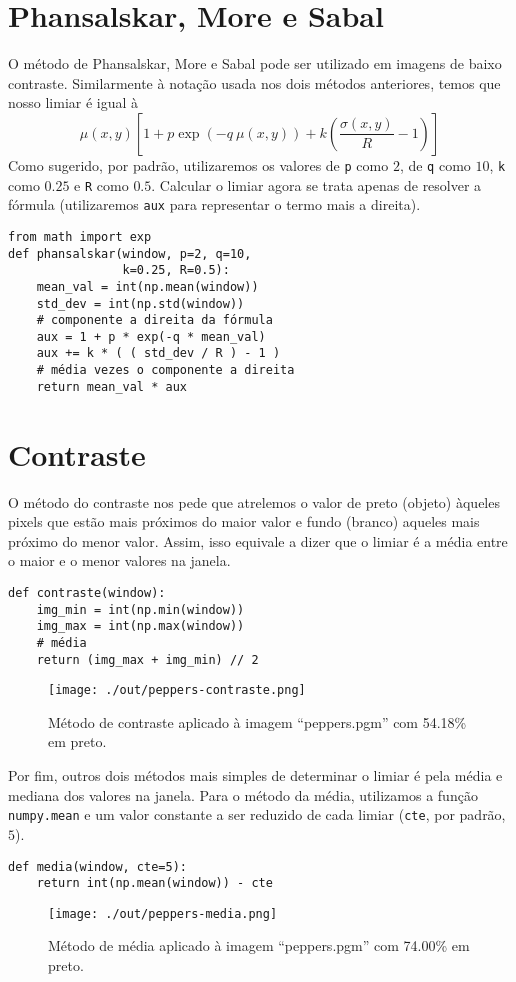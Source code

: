 \documentclass[twocolumn, 10pt]{article}
\begin{document}
\section*{Phansalskar, More e Sabal}
\label{sec:org0166470}
O método de Phansalskar, More e Sabal pode ser utilizado em imagens de baixo contraste.
Similarmente à notação usada nos dois métodos anteriores, temos que nosso limiar é igual à
\[\mu(x, y)\left[1+p \exp (-q\ \mu(x, y))+k\left(\frac{\sigma(x, y)}{R}-1\right)\right] \]
Como sugerido, por padrão, utilizaremos os valores de \texttt{p} como \(2\), de \texttt{q} como \(10\), \texttt{k} como \(0.25\) e \texttt{R} como \(0.5\).
Calcular o limiar agora se trata apenas de resolver a fórmula (utilizaremos \texttt{aux} para representar o termo mais a direita).
\begin{verbatim}
from math import exp
def phansalskar(window, p=2, q=10,
                k=0.25, R=0.5):
    mean_val = int(np.mean(window))
    std_dev = int(np.std(window))
    # componente a direita da fórmula
    aux = 1 + p * exp(-q * mean_val)
    aux += k * ( ( std_dev / R ) - 1 )
    # média vezes o componente a direita
    return mean_val * aux
\end{verbatim}
\section*{Contraste}
\label{sec:org76e750e}
O método do contraste nos pede que atrelemos o valor de preto (objeto) àqueles pixels que estão mais próximos do maior valor e fundo (branco) aqueles mais próximo do menor valor.
Assim, isso equivale a dizer que o limiar é a média entre o maior e o menor valores na janela.
\begin{verbatim}
def contraste(window):
    img_min = int(np.min(window))
    img_max = int(np.max(window))
    # média
    return (img_max + img_min) // 2
\end{verbatim}
\begin{figure}[htbp]
\centering
\texttt{[image: ./out/peppers-contraste.png]}
\caption{Método de contraste aplicado à imagem ``peppers.pgm'' com  54.18\% em preto.}
\end{figure}

Por fim, outros dois métodos mais simples de determinar o limiar é pela média e mediana dos valores na janela.
Para o método da média, utilizamos a função \texttt{numpy.mean} e um valor constante a ser reduzido de cada limiar (\texttt{cte}, por padrão, \(5\)).
\begin{verbatim}
def media(window, cte=5):
    return int(np.mean(window)) - cte
\end{verbatim}
\begin{figure}[htbp]
\centering
\texttt{[image: ./out/peppers-media.png]}
\caption{Método de média aplicado à imagem ``peppers.pgm'' com 74.00\% em preto.}
\end{figure}
\end{document}
